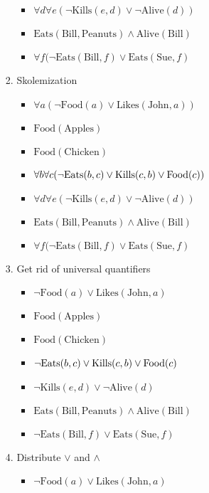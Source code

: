 \documentclass[12pt]{article}
\begin{document}
\begin{enumerate}
\begin{enumerate}
\begin{enumerate}[label=\arabic*.]
\begin{itemize}
						\item $\forall d \forall e (\neg \text{Kills}(e, d) \lor \neg \text{Alive}(d))$
						\item $\text{Eats}(\text{Bill}, \text{Peanuts}) \land \text{Alive}(\text{Bill})$
						\item $\forall f (\neg \text{Eats}(\text{Bill}, f) \lor \text{Eats}(\text{Sue}, f)$
					\end{itemize}
				\item Skolemization
					\begin{itemize}
						\item $\forall a (\neg \text{Food}(a) \lor \text{Likes}(\text{John}, a))$
						\item $\text{Food}(\text{Apples})$
						\item $\text{Food}(\text{Chicken})$
						\item $\forall b \forall c (\neg \text{Eats}(b, c) \lor  \text{\text{Kills}}(c, b) \lor \text{Food}(c))$
						\item $\forall d \forall e (\neg \text{Kills}(e, d) \lor \neg \text{Alive}(d))$
						\item $\text{Eats}(\text{Bill}, \text{Peanuts}) \land \text{Alive}(\text{Bill})$
						\item $\forall f (\neg \text{Eats}(\text{Bill}, f) \lor \text{Eats}(\text{Sue}, f)$
					\end{itemize}
				\item Get rid of universal quantifiers
					\begin{itemize}
						\item $\neg \text{Food}(a) \lor \text{Likes}(\text{John}, a)$
						\item $\text{Food}(\text{Apples})$
						\item $\text{Food}(\text{Chicken})$
						\item $\neg \text{Eats}(b, c) \lor  \text{\text{Kills}}(c, b) \lor \text{Food}(c)$
						\item $\neg \text{Kills}(e, d) \lor \neg \text{Alive}(d)$
						\item $\text{Eats}(\text{Bill}, \text{Peanuts}) \land \text{Alive}(\text{Bill})$
						\item $\neg \text{Eats}(\text{Bill}, f) \lor \text{Eats}(\text{Sue}, f)$
					\end{itemize}
				\item Distribute $\lor$ and $\land$
					\begin{itemize}
						\item $\neg \text{Food}(a) \lor \text{Likes}(\text{John}, a)$

\end{itemize}
\end{enumerate}
\end{enumerate}
\end{enumerate}
\end{document}
